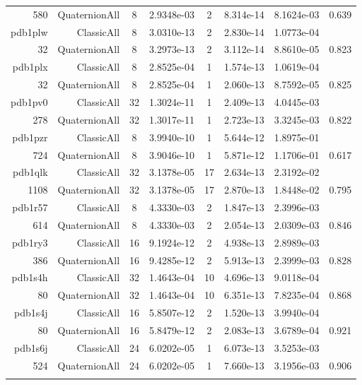 \begin{xltabular}{\textwidth}{r|rcS[table-format=1.4e+2]cS[table-format=1.3e+2]S[table-format=1.4e+2]S[table-format=-1.3]}
580 & QuaternionAll & 8 & 2.9348e-03 & 2 & 8.314e-14 & 8.1624e-03 & 0.639\\  \addlinespace
pdb1plw & ClassicAll & 8 & 3.0310e-13 & 2 & 2.830e-14 & 1.0773e-04 & \\
32 & QuaternionAll & 8 & 3.2973e-13 & 2 & 3.112e-14 & 8.8610e-05 & 0.823\\  \addlinespace
pdb1plx & ClassicAll & 8 & 2.8525e-04 & 1 & 1.574e-13 & 1.0619e-04 & \\
32 & QuaternionAll & 8 & 2.8525e-04 & 1 & 2.060e-13 & 8.7592e-05 & 0.825\\  \addlinespace
pdb1pv0 & ClassicAll & 32 & 1.3024e-11 & 1 & 2.409e-13 & 4.0445e-03 & \\
278 & QuaternionAll & 32 & 1.3017e-11 & 1 & 2.723e-13 & 3.3245e-03 & 0.822\\  \addlinespace
pdb1pzr & ClassicAll & 8 & 3.9940e-10 & 1 & 5.644e-12 & 1.8975e-01 & \\
724 & QuaternionAll & 8 & 3.9046e-10 & 1 & 5.871e-12 & 1.1706e-01 & 0.617\\  \addlinespace
pdb1qlk & ClassicAll & 32 & 3.1378e-05 & 17 & 2.634e-13 & 2.3192e-02 & \\
1108 & QuaternionAll & 32 & 3.1378e-05 & 17 & 2.870e-13 & 1.8448e-02 & 0.795\\  \addlinespace
pdb1r57 & ClassicAll & 8 & 4.3330e-03 & 2 & 1.847e-13 & 2.3996e-03 & \\
614 & QuaternionAll & 8 & 4.3330e-03 & 2 & 2.054e-13 & 2.0309e-03 & 0.846\\  \addlinespace
pdb1ry3 & ClassicAll & 16 & 9.1924e-12 & 2 & 4.938e-13 & 2.8989e-03 & \\
386 & QuaternionAll & 16 & 9.4285e-12 & 2 & 5.913e-13 & 2.3999e-03 & 0.828\\  \addlinespace
pdb1s4h & ClassicAll & 32 & 1.4643e-04 & 10 & 4.696e-13 & 9.0118e-04 & \\
80 & QuaternionAll & 32 & 1.4643e-04 & 10 & 6.351e-13 & 7.8235e-04 & 0.868\\  \addlinespace
pdb1s4j & ClassicAll & 16 & 5.8507e-12 & 2 & 1.520e-13 & 3.9940e-04 & \\
80 & QuaternionAll & 16 & 5.8479e-12 & 2 & 2.083e-13 & 3.6789e-04 & 0.921\\  \addlinespace
pdb1s6j & ClassicAll & 24 & 6.0202e-05 & 1 & 6.073e-13 & 3.5253e-03 & \\
524 & QuaternionAll & 24 & 6.0202e-05 & 1 & 7.660e-13 & 3.1956e-03 & 0.906\\  \addlinespace

\end{xltabular}
